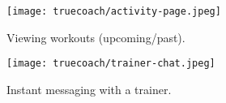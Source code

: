 \begin{figure}[H]
    \centering
    \begin{minipage}{0.4\textwidth}
        \centering
        \texttt{[image: truecoach/activity-page.jpeg]}
        \caption{Viewing workouts (upcoming/past).}
        \label{fig:tc-activity}
    \end{minipage}\qquad
    \begin{minipage}{0.4\textwidth}
        \centering
        \texttt{[image: truecoach/trainer-chat.jpeg]}
        \caption{Instant messaging with a trainer.}
        \label{fig:tc-trainer-chat}
    \end{minipage}%
\end{figure}
